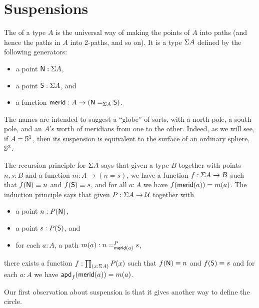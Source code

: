 \section{Suspensions}
\label{sec:suspension}

The  of a type $A$ is the universal way of making the points of $A$ into paths (and hence the paths in $A$ into 2-paths, and so on).
It is a type $\susp A$ defined by the following generators:
\begin{itemize}
\item a point $\north:\susp A$,
\item a point $\south:\susp A$, and
\item a function $\merid:A \to (\id[\susp A]\north\south)$.
\end{itemize}
The names are intended to suggest a ``globe'' of sorts, with a north pole, a south pole, and an $A$'s worth of meridians from one to the other.
Indeed, as we will see, if $A=\Sn^1$, then its suspension is equivalent to the surface of an ordinary sphere, $\Sn^2$.

The recursion principle for $\susp A$ says that given a type $B$ together with points $n,s:B$ and a function $m:A \to (n=s)$, we have a function $f:\susp A \to B$ such that $f(\north)\jdeq n$ and $f(\south)\jdeq s$, and for all $a:A$ we have $\ap f {\merid(a)} = m(a)$.
The induction principle says that given $P:\susp A \to \type$ together with
\begin{itemize}
\item a point $n:P(\north)$,
\item a point $s:P(\south)$, and
\item for each $a:A$, a path $m(a):\dpath P{\merid(a)}ns$,
\end{itemize}
there exists a function $f:\prd{x:\susp A} P(x)$ such that $f(\north)\jdeq n$ and $f(\south)\jdeq s$ and for each $a:A$ we have $\apd f {\merid(a)} = m(a)$.

Our first observation about suspension is that it gives another way to define the circle.

